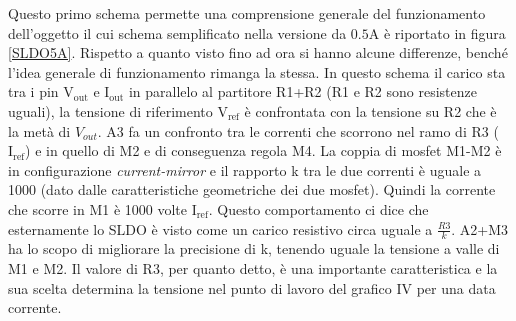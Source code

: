 Questo primo schema permette una comprensione generale del funzionamento dell'oggetto il cui schema semplificato nella versione da $\mathrm{0.5 A}$ è riportato in figura \ref{SLDO5A}. Rispetto a quanto visto fino ad ora si hanno alcune differenze, benché l'idea generale di funzionamento rimanga la stessa. 
In questo schema il carico sta tra i pin $\mathrm{V_{out}}$ e $\mathrm{I_{out}}$ in parallelo al partitore R1+R2 (R1 e R2 sono resistenze uguali), la tensione di riferimento $\mathrm{V_{ref}}$ è confrontata con la tensione su R2 che è la metà di $V_{out}$. A3 fa un confronto tra le correnti che scorrono nel ramo di R3 ($\mathrm{I_{ref}}$) e in quello di M2 e di conseguenza regola M4. La coppia di mosfet M1-M2 è in configurazione \textit{current-mirror} e il rapporto k tra le due correnti è uguale a 1000 (dato dalle caratteristiche geometriche dei due mosfet). 
Quindi la corrente che scorre in M1 è 1000 volte $\mathrm{I_{ref}}$. Questo comportamento ci dice che esternamente lo SLDO è visto come un carico resistivo circa uguale a $\frac{R3}{k}$. A2+M3 ha lo scopo di migliorare la precisione di k, tenendo uguale la tensione a valle di M1 e M2. Il valore di R3, per quanto detto, è una importante caratteristica e la sua scelta determina la tensione nel punto di lavoro del grafico IV per una data corrente. 

